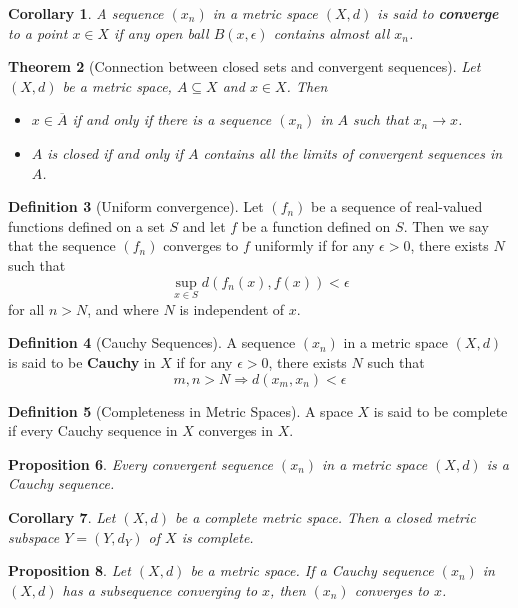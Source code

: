 \documentclass[10pt, oneside, reqno]{amsart}
\theoremstyle{plain}%
\newtheorem{thm}{Theorem}[section]
\newtheorem{prop}[thm]{Proposition}
\newtheorem{cor}[thm]{Corollary}
\theoremstyle{definition}
\newtheorem{defn}[thm]{Definition}
\theoremstyle{remark}
\newcommand{\met}{(X,d)}
\newcommand{\ol}[1]{\overline{#1}}
\begin{document}
\begin{cor}
	A sequence $(x_n)$ in a metric space $\met$ is said to \textbf{converge} to a point $x \in X$ if any open ball $B(x, \epsilon)$ contains almost all $x_n$.
\end{cor}

\begin{thm}[Connection between closed sets and convergent sequences]
	Let $\met$ be a metric space, $A \subseteq X$ and $x \in X$.  Then 
	\begin{itemize}
		\item $x \in \ol{A}$ if and only if there is a sequence $(x_n)$ in $A$ such that $x_n \rightarrow x$.
		\item $A$ is closed if and only if $A$ contains all the limits of convergent sequences in $A$.
	\end{itemize}
\end{thm}

\begin{defn}[Uniform convergence]
Let $(f_n)$ be a sequence of real-valued functions defined on a set $S$ and let $f$ be a function defined on $S$.  Then we say that the sequence $(f_n)$ converges to $f$ uniformly if for any $\epsilon > 0$, there exists $N$ such that \[
	\sup_{x \in S} d(f_n(x), f(x)) < \epsilon
\] for all $n > N$, and where $N$ is independent of $x$.
\end{defn}

\begin{defn}[Cauchy Sequences]
	A sequence $(x_n)$ in a metric space $\met$ is said to be \textbf{Cauchy} in $X$ if for any $\epsilon > 0$, there exists $N$ such that \[
		m,n > N \Rightarrow d(x_m, x_n) < \epsilon
	\]
\end{defn}

\begin{defn}[Completeness in Metric Spaces]
A space $X$ is said to be complete if every Cauchy sequence in $X$ converges in $X$.
\end{defn}

\begin{prop}
	Every convergent sequence $(x_n)$ in a metric space $\met$ is a Cauchy sequence.
\end{prop}

\begin{cor}
	Let $\met$ be a complete metric space.  Then a closed metric subspace $Y = (Y, d_Y)$ of $X$ is complete.  
\end{cor}

\begin{prop}
	Let $\met$ be a metric space.  If a Cauchy sequence $(x_n)$ in $\met$ has a subsequence converging to $x$, then $(x_n)$ converges to $x$.
\end{prop}
\end{document}
